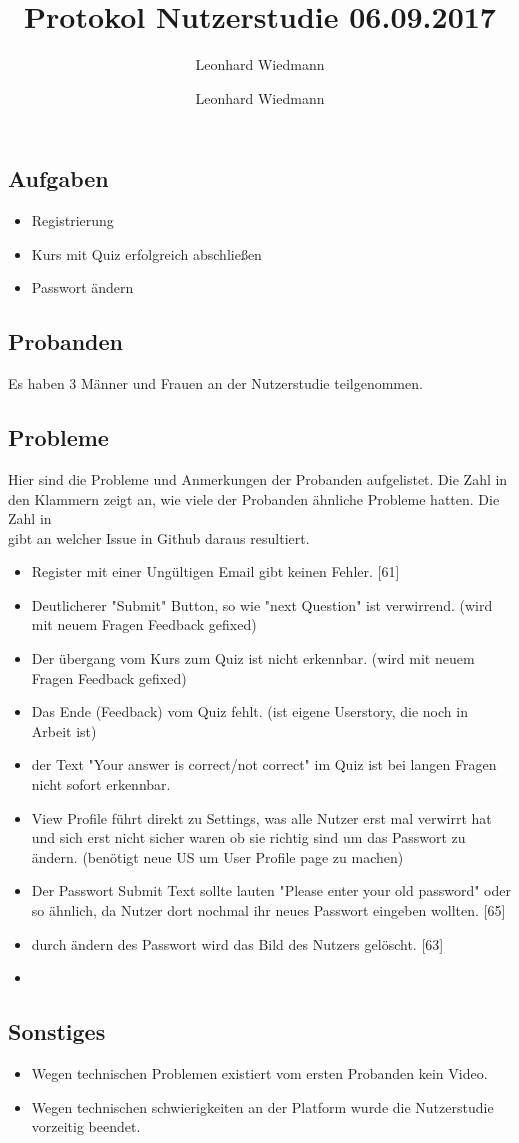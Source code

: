 \documentclass[colorback, accentcolor=tud1c, paper=a4]{tudexercise}
\title{Protokol Nutzerstudie 06.09.2017}
\subtitle{Leonhard Wiedmann}
\author{Leonhard Wiedmann}
\begin{document}
\maketitle
\subsection*{Aufgaben}
\begin{itemize}
  \item Registrierung
  \item Kurs mit Quiz erfolgreich abschließen
  \item Passwort ändern
\end{itemize}

\subsection*{Probanden}
Es haben 3 Männer und Frauen an der Nutzerstudie teilgenommen.

\subsection*{Probleme}
 Hier sind die Probleme und Anmerkungen der Probanden aufgelistet. Die Zahl in den Klammern zeigt an, wie viele der Probanden ähnliche Probleme hatten. Die Zahl in \[\] gibt an welcher Issue in Github daraus resultiert.
  \begin{itemize}
		\item Register mit einer Ungültigen Email gibt keinen Fehler. [61]
    \item Deutlicherer "Submit" Button, so wie "next Question" ist verwirrend. (wird mit neuem Fragen Feedback gefixed)
		\item Der übergang vom Kurs zum Quiz ist nicht erkennbar. (wird mit neuem Fragen Feedback gefixed)
		\item Das Ende (Feedback) vom Quiz fehlt. (ist eigene Userstory, die noch in Arbeit ist)
		\item der Text "Your answer is correct/not correct" im Quiz ist bei langen Fragen nicht sofort erkennbar.
		\item View Profile führt direkt zu Settings, was alle Nutzer erst mal verwirrt hat und sich erst nicht sicher waren ob sie richtig sind um das Passwort zu ändern. (benötigt neue US um User Profile page zu machen)
		\item Der Passwort Submit Text sollte lauten "Please enter your old password" oder so ähnlich, da Nutzer dort nochmal ihr neues Passwort eingeben wollten. [65]
		\item durch ändern des Passwort wird das Bild des Nutzers gelöscht. [63]
		\item
   \end{itemize}

   \subsection*{Sonstiges}
	 	\begin{itemize}
			\item Wegen technischen Problemen existiert vom ersten Probanden kein Video.
			\item Wegen technischen schwierigkeiten an der Platform wurde die Nutzerstudie vorzeitig beendet.
		\end{itemize}
\end{document}
